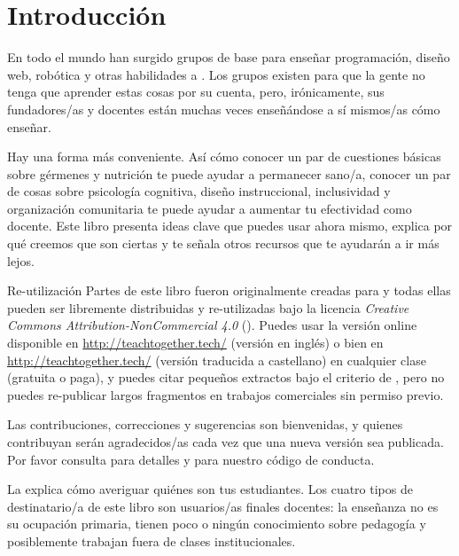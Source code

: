 \chapter{Introducción}\label{s:intro}

En todo el mundo han surgido grupos de base
para enseñar programación, diseño web, robótica y otras habilidades
a .
Los grupos existen para que la gente no tenga que aprender estas cosas por su cuenta,
pero, irónicamente,
sus fundadores/as y docentes están muchas veces enseñándose a sí mismos/as cómo enseñar.

Hay una forma más conveniente.
Así cómo conocer un par de cuestiones básicas sobre gérmenes y nutrición te puede ayudar a permanecer sano/a,
conocer un par de cosas sobre psicología cognitiva,
diseño instruccional,
inclusividad
y organización comunitaria
te puede ayudar a aumentar tu efectividad como docente.
Este libro presenta ideas clave que puedes usar ahora mismo,
explica por qué creemos que son ciertas
y te señala otros recursos que te ayudarán a ir más lejos.

\begin{aside}{Re-utilización}
Partes de este libro fueron originalmente creadas para
y todas ellas pueden ser libremente distribuidas y re-utilizadas
bajo la licencia \emph{Creative Commons Attribution-NonCommercial 4.0}
  ().
Puedes usar la versión online disponible en \url{http://teachtogether.tech/} (versión en inglés) 
o bien en \url{http://teachtogether.tech/} (versión traducida a castellano) 
en cualquier clase
(gratuita o paga),
y puedes citar pequeños extractos bajo el criterio de ,
pero no puedes re-publicar largos fragmentos en trabajos comerciales sin permiso previo.

Las contribuciones, correcciones y sugerencias son bienvenidas,
y quienes contribuyan serán agradecidos/as cada vez que una nueva versión sea publicada.
Por favor consulta  para detalles
y  para nuestro código de conducta. 
\end{aside}


La  explica cómo averiguar quiénes son tus estudiantes. Los cuatro tipos de destinatario/a de este libro son usuarios/as finales docentes: la enseñanza no es su ocupación primaria, tienen poco o ningún conocimiento sobre pedagogía y posiblemente trabajan fuera de clases institucionales.


